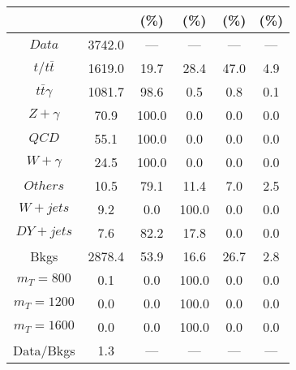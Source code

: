 \begin{figure}
\begin{minipage}[c]{0.32\textwidth}
{\begin{tabular}{cccccc}
 &  & (\%) & (\%) & (\%) & (\%)  \\
\hline
                                                                      $ Data $ &  3742.0 &  --- &  --- &  --- &  ---\\
$ t/t\bar{t} $ &  1619.0 &  19.7 &  28.4 &  47.0 &  4.9\\
$ t\bar{t}\gamma $ &  1081.7 &  98.6 &  0.5 &  0.8 &  0.1\\
$ Z+\gamma $ &  70.9 &  100.0 &  0.0 &  0.0 &  0.0\\
$ QCD $ &  55.1 &  100.0 &  0.0 &  0.0 &  0.0\\
$ W+\gamma $ &  24.5 &  100.0 &  0.0 &  0.0 &  0.0\\
$ Others $ &  10.5 &  79.1 &  11.4 &  7.0 &  2.5\\
$ W+jets $ &  9.2 &  0.0 &  100.0 &  0.0 &  0.0\\
$ DY+jets $ &  7.6 &  82.2 &  17.8 &  0.0 &  0.0\\
Bkgs &  2878.4 &  53.9 &  16.6 &  26.7 &  2.8\\
$ m_{T} = 800 $ &  0.1 &  0.0 &  100.0 &  0.0 &  0.0\\
$ m_{T} = 1200 $ &  0.0 &  0.0 &  100.0 &  0.0 &  0.0\\
$ m_{T} = 1600 $ &  0.0 &  0.0 &  100.0 &  0.0 &  0.0\\
Data/Bkgs &  1.3 &  --- &  --- &  --- &  ---\\
\hline
\end{tabular}
}
\end{minipage}
\end{figure}

